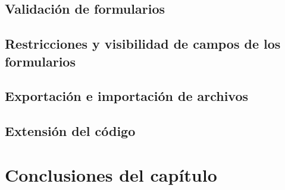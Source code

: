 \subsection{Validación de formularios}
\subsection{Restricciones y visibilidad de campos de los formularios}
\subsection{Exportación e importación de archivos}
\subsection{Extensión del código}
\section{Conclusiones del capítulo}